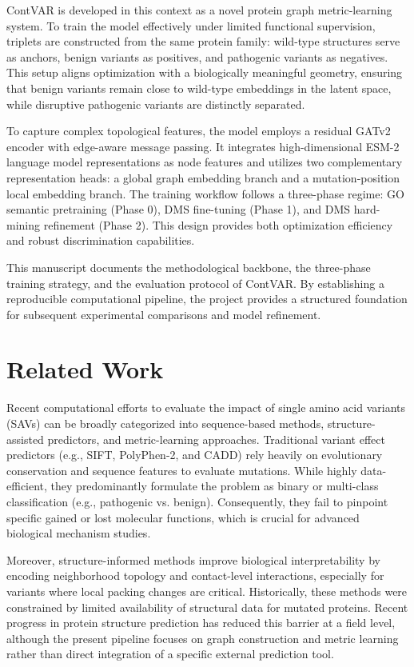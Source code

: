 \documentclass[unnumsec,webpdf,contemporary,large]{oup-authoring-template}%
\theoremstyle{thmstyleone}%
\theoremstyle{thmstyletwo}%
\theoremstyle{thmstylethree}%
\begin{document}
ContVAR is developed in this context as a novel protein graph metric-learning system. To train the model effectively under limited functional supervision, triplets are constructed from the same protein family: wild-type structures serve as anchors, benign variants as positives, and pathogenic variants as negatives. This setup aligns optimization with a biologically meaningful geometry, ensuring that benign variants remain close to wild-type embeddings in the latent space, while disruptive pathogenic variants are distinctly separated.

To capture complex topological features, the model employs a residual GATv2 encoder with edge-aware message passing. It integrates high-dimensional ESM-2 language model representations as node features and utilizes two complementary representation heads: a global graph embedding branch and a mutation-position local embedding branch. The training workflow follows a three-phase regime: GO semantic pretraining (Phase 0), DMS fine-tuning (Phase 1), and DMS hard-mining refinement (Phase 2). This design provides both optimization efficiency and robust discrimination capabilities.

This manuscript documents the methodological backbone, the three-phase training strategy, and the evaluation protocol of ContVAR. By establishing a reproducible computational pipeline, the project provides a structured foundation for subsequent experimental comparisons and model refinement.

\section{Related Work}\label{sec2}

Recent computational efforts to evaluate the impact of single amino acid variants (SAVs) can be broadly categorized into sequence-based methods, structure-assisted predictors, and metric-learning approaches. Traditional variant effect predictors (e.g., SIFT, PolyPhen-2, and CADD) rely heavily on evolutionary conservation and sequence features to evaluate mutations. While highly data-efficient, they predominantly formulate the problem as binary or multi-class classification (e.g., pathogenic vs. benign). Consequently, they fail to pinpoint specific gained or lost molecular functions, which is crucial for advanced biological mechanism studies.

Moreover, structure-informed methods improve biological interpretability by encoding neighborhood topology and contact-level interactions, especially for variants where local packing changes are critical. Historically, these methods were constrained by limited availability of structural data for mutated proteins. Recent progress in protein structure prediction has reduced this barrier at a field level, although the present pipeline focuses on graph construction and metric learning rather than direct integration of a specific external prediction tool.
\end{document}
